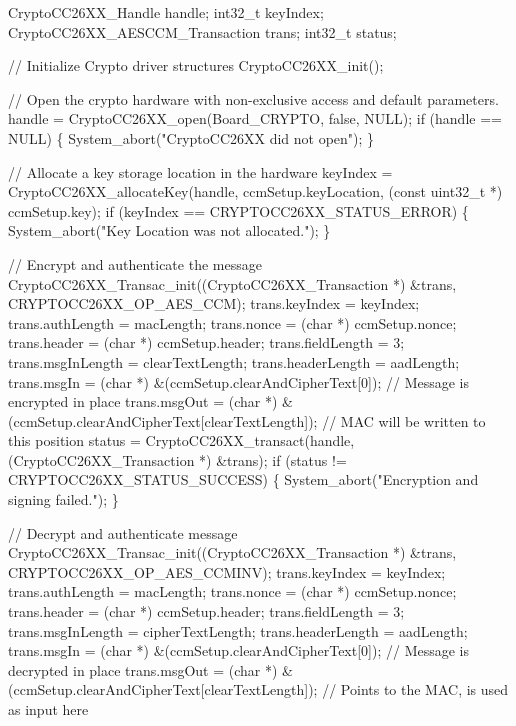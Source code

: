 \begin{DoxyCode}
CryptoCC26XX_Handle             handle;
int32\_t                         keyIndex;
CryptoCC26XX_AESCCM_Transaction trans;
int32\_t                         status;

\textcolor{comment}{// Initialize Crypto driver structures}
CryptoCC26XX_init();

\textcolor{comment}{// Open the crypto hardware with non-exclusive access and default parameters.}
handle = CryptoCC26XX_open(Board\_CRYPTO, \textcolor{keyword}{false}, NULL);
\textcolor{keywordflow}{if} (handle == NULL) \{
    System\_abort(\textcolor{stringliteral}{"CryptoCC26XX did not open"});
\}

\textcolor{comment}{// Allocate a key storage location in the hardware}
keyIndex = CryptoCC26XX_allocateKey(handle, ccmSetup.keyLocation, (\textcolor{keyword}{const} uint32\_t *) ccmSetup.key);
\textcolor{keywordflow}{if} (keyIndex == CRYPTOCC26XX_STATUS_ERROR) \{
    System\_abort(\textcolor{stringliteral}{"Key Location was not allocated."});
\}

\textcolor{comment}{// Encrypt and authenticate the message}
CryptoCC26XX_Transac_init((CryptoCC26XX_Transaction *) &trans, 
      CRYPTOCC26XX_OP_AES_CCM);
trans.keyIndex   = keyIndex;
trans.authLength = macLength;
trans.nonce  = (\textcolor{keywordtype}{char} *) ccmSetup.nonce;
trans.header = (\textcolor{keywordtype}{char} *) ccmSetup.header;
trans.fieldLength  = 3;
trans.msgInLength  = clearTextLength;
trans.headerLength = aadLength;
trans.msgIn  = (\textcolor{keywordtype}{char} *) &(ccmSetup.clearAndCipherText[0]);                \textcolor{comment}{// Message is encrypted in place}
trans.msgOut = (\textcolor{keywordtype}{char} *) &(ccmSetup.clearAndCipherText[clearTextLength]);  \textcolor{comment}{// MAC will be written to this
       position}
status = CryptoCC26XX_transact(handle, (CryptoCC26XX_Transaction *) &trans);
\textcolor{keywordflow}{if} (status != CRYPTOCC26XX_STATUS_SUCCESS) \{
    System\_abort(\textcolor{stringliteral}{"Encryption and signing failed."});
\}

\textcolor{comment}{// Decrypt and authenticate message}
CryptoCC26XX_Transac_init((CryptoCC26XX_Transaction *) &trans, 
      CRYPTOCC26XX_OP_AES_CCMINV);
trans.keyIndex   = keyIndex;
trans.authLength = macLength;
trans.nonce  = (\textcolor{keywordtype}{char} *) ccmSetup.nonce;
trans.header = (\textcolor{keywordtype}{char} *) ccmSetup.header;
trans.fieldLength  = 3;
trans.msgInLength  = cipherTextLength;
trans.headerLength = aadLength;
trans.msgIn  = (\textcolor{keywordtype}{char} *) &(ccmSetup.clearAndCipherText[0]);                \textcolor{comment}{// Message is decrypted in place}
trans.msgOut = (\textcolor{keywordtype}{char} *) &(ccmSetup.clearAndCipherText[clearTextLength]);  \textcolor{comment}{// Points to the MAC, is used as
       input here}


\end{DoxyCode}
